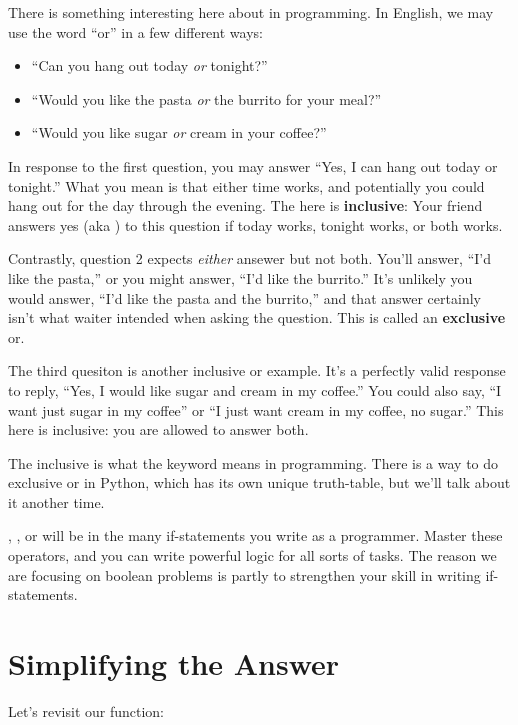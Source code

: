 \documentclass[12pt]{scrartcl}
\newcommand{\pyTrue}[1][]{\pythonl[fontsize=#1]{True}\xspace}
\begin{document}
There is something interesting here about  in programming. In English, we may use the word ``or'' in a few different ways:
\begin{itemize}
    \item ``Can you hang out today \textit{or} tonight?''
    \item ``Would you like the pasta \textit{or} the burrito for your meal?''
    \item ``Would you like sugar \textit{or} cream in your coffee?''
\end{itemize}
In response to the first question, you may answer ``Yes, I can hang out today or tonight.'' What you mean is that either time works, and potentially you could hang out for the day through the evening. The  here is \textbf{inclusive}: Your friend answers yes (aka \pyTrue) to this question if today works, tonight works, or both works. 

Contrastly, question 2 expects \textit{either} ansewer but not both. You'll answer, ``I'd like the pasta,'' or you might answer, ``I'd like the burrito.'' It's unlikely you would answer, ``I'd like the pasta and the burrito,'' and that answer certainly isn't what waiter intended when asking the question. This is called an \textbf{exclusive} or.

The third quesiton is another inclusive or example. It's a perfectly valid response to reply, ``Yes, I would like sugar and cream in my coffee.'' You could also say, ``I want just sugar in my coffee'' or ``I just want cream in my coffee, no sugar.'' This  here is inclusive: you are allowed to answer both.

The inclusive  is what the keyword  means in programming. There is a way to do exclusive or in Python, which has its own unique truth-table, but we'll talk about it another time.

, , or  will be in the many if-statements you write as a programmer. Master these operators, and you can write powerful logic for all sorts of tasks. The reason we are focusing on boolean problems is partly to strengthen your skill in writing if-statements.

\section{Simplifying the Answer}

Let's revisit our  function:
\end{document}
